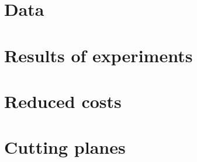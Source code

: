 

\chapter{Data}\label{ch:appendix-data}


\clearpage


\chapter{Results of experiments}\label{ch:results_additional_experiments}


\clearpage

\chapter{Reduced costs}\label{ch:reduced_costs}


%

\clearpage


\chapter{Cutting planes}\label{ch:cutting_planes}


